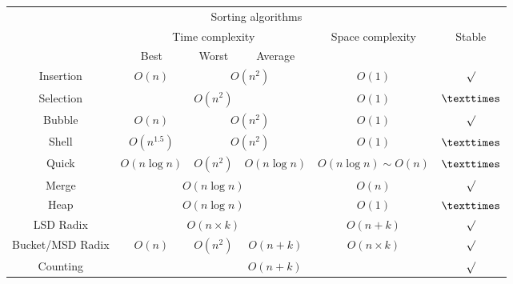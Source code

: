 \begin{table}[H]
    \centering
    \begin{tabular}{|c|c|c|c|c|c|}
        \hline
        \multicolumn{6}{|c|}{Sorting algorithms} \\
        \Xhline{3\arrayrulewidth}
        \multirow{2}{*}{Method} & \multicolumn{3}{c|}{Time complexity} & \multirow{2}{*}{Space complexity} & \multirow{2}{*}{Stable} \\
        \cline{2-4}
        & Best & Worst & Average & & \\
        \Xhline{2\arrayrulewidth}
        Insertion & $O(n)$ & \multicolumn{2}{c|}{$O(n^2)$} & $O(1)$ & $\surd$ \\
        \hline
        Selection & \multicolumn{3}{c|}{$O(n^2)$} & $O(1)$ & $\texttimes$ \\
        \hline
        Bubble & $O(n)$ & \multicolumn{2}{c|}{$O(n^2)$} & $O(1)$ & $\surd$ \\
        \hline
        Shell & $O(n^{1.5})$ & \multicolumn{2}{c|}{$O(n^2)$} & $O(1)$ & $\texttimes$ \\
        \hline
        Quick & $O(n\log n)$ & $O(n^2)$ & $O(n\log n)$ & $O(n\log n) \sim O(n)$ & $\texttimes$ \\
        \hline
        Merge & \multicolumn{3}{c|}{$O(n\log n)$} & $O(n)$ & $\surd$ \\
        \hline
        Heap & \multicolumn{3}{c|}{$O(n\log n)$} & $O(1)$ & $\texttimes$ \\
        \hline
        LSD Radix & \multicolumn{3}{c|}{$O(n \times k)$} & $O(n + k)$ & $\surd$ \\
        \hline
        Bucket/MSD Radix & $O(n)$ & $O(n^2)$ & $O(n + k)$ & $O(n \times k)$ & $\surd$ \\
        \hline
        Counting & \multicolumn{4}{c|}{$O(n + k)$} & $\surd$ \\
        \hline
    \end{tabular}
\end{table}

